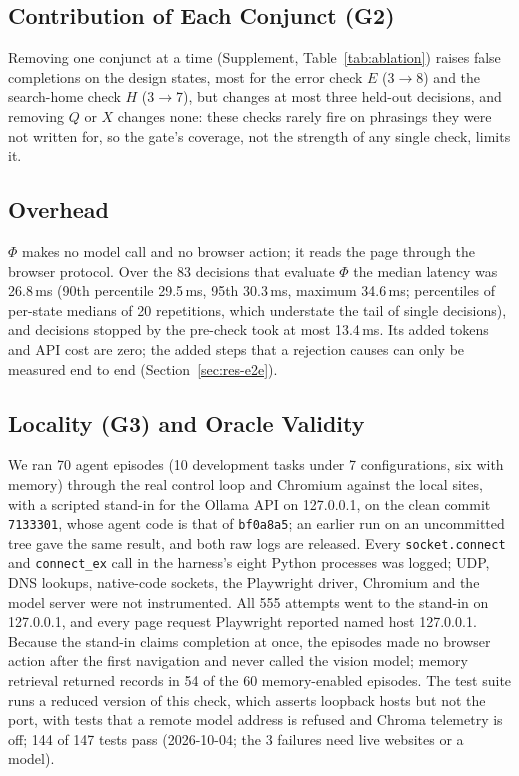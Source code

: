 \subsection{Contribution of Each Conjunct (G2)}
\label{sec:res-ablation}

Removing one conjunct at a time (Supplement, Table~\ref{tab:ablation}) raises false completions on the design states, most for the error check $E$ (3$\to$8) and the search-home check $H$ (3$\to$7), but changes at most three held-out decisions, and removing $Q$ or $X$ changes none: these checks rarely fire on phrasings they were not written for, so the gate's coverage, not the strength of any single check, limits it.

\subsection{Overhead}
\label{sec:res-overhead}

$\Phi$ makes no model call and no browser action; it reads the page through the browser protocol. Over the 83 decisions that evaluate $\Phi$ the median latency was 26.8\,ms (90th percentile 29.5\,ms, 95th 30.3\,ms, maximum 34.6\,ms; percentiles of per-state medians of 20 repetitions, which understate the tail of single decisions), and decisions stopped by the pre-check took at most 13.4\,ms. Its added tokens and API cost are zero; the added steps that a rejection causes can only be measured end to end (Section~\ref{sec:res-e2e}).

\subsection{Locality (G3) and Oracle Validity}
\label{sec:res-privacy}

We ran 70 agent episodes (10 development tasks under 7 configurations, six with memory) through the real control loop and Chromium against the local sites, with a scripted stand-in for the Ollama API on 127.0.0.1, on the clean commit \texttt{7133301}, whose agent code is that of \texttt{bf0a8a5}; an earlier run on an uncommitted tree gave the same result, and both raw logs are released. Every \texttt{socket.connect} and \texttt{connect\_ex} call in the harness's eight Python processes was logged; UDP, DNS lookups, native-code sockets, the Playwright driver, Chromium and the model server were not instrumented. All 555 attempts went to the stand-in on 127.0.0.1, and every page request Playwright reported named host 127.0.0.1. Because the stand-in claims completion at once, the episodes made no browser action after the first navigation and never called the vision model; memory retrieval returned records in 54 of the 60 memory-enabled episodes. The test suite runs a reduced version of this check, which asserts loopback hosts but not the port, with tests that a remote model address is refused and Chroma telemetry is off; 144 of 147 tests pass (2026-10-04; the 3 failures need live websites or a model).

